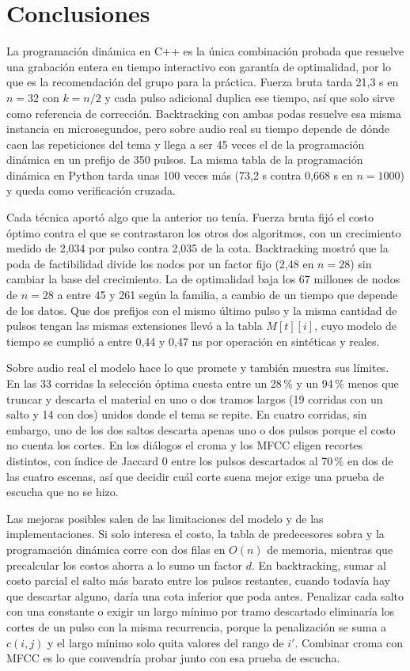 \section{Conclusiones}
\label{sec:conclusiones}

La programación dinámica en C++ es la única combinación probada que resuelve una grabación entera en tiempo interactivo con garantía de optimalidad, por lo que es la recomendación del grupo para la práctica. Fuerza bruta tarda 21,3 s en $n = 32$ con $k = n/2$ y cada pulso adicional duplica ese tiempo, así que solo sirve como referencia de corrección. Backtracking con ambas podas resuelve esa misma instancia en microsegundos, pero sobre audio real su tiempo depende de dónde caen las repeticiones del tema y llega a ser 45 veces el de la programación dinámica en un prefijo de 350 pulsos. La misma tabla de la programación dinámica en Python tarda unas 100 veces más (73,2 s contra 0,668 s en $n = 1000$) y queda como verificación cruzada.

Cada técnica aportó algo que la anterior no tenía. Fuerza bruta fijó el costo óptimo contra el que se contrastaron los otros dos algoritmos, con un crecimiento medido de 2,034 por pulso contra 2,035 de la cota. Backtracking mostró que la poda de factibilidad divide los nodos por un factor fijo (2,48 en $n = 28$) sin cambiar la base del crecimiento. La de optimalidad baja los 67 millones de nodos de $n = 28$ a entre 45 y 261 según la familia, a cambio de un tiempo que depende de los datos. Que dos prefijos con el mismo último pulso y la misma cantidad de pulsos tengan las mismas extensiones llevó a la tabla $M[t][i]$, cuyo modelo de tiempo se cumplió a entre 0,44 y 0,47 ns por operación en sintéticas y reales.

Sobre audio real el modelo hace lo que promete y también muestra sus límites. En las 33 corridas la selección óptima cuesta entre un 28\,\% y un 94\,\% menos que truncar y descarta el material en uno o dos tramos largos (19 corridas con un salto y 14 con dos) unidos donde el tema se repite. En cuatro corridas, sin embargo, uno de los dos saltos descarta apenas uno o dos pulsos porque el costo no cuenta los cortes. En los diálogos el croma y los MFCC eligen recortes distintos, con índice de Jaccard 0 entre los pulsos descartados al 70\,\% en dos de las cuatro escenas, así que decidir cuál corte suena mejor exige una prueba de escucha que no se hizo.

Las mejoras posibles salen de las limitaciones del modelo y de las implementaciones. Si solo interesa el costo, la tabla de predecesores sobra y la programación dinámica corre con dos filas en $O(n)$ de memoria, mientras que precalcular los costos ahorra a lo sumo un factor $d$. En backtracking, sumar al costo parcial el salto más barato entre los pulsos restantes, cuando todavía hay que descartar alguno, daría una cota inferior que poda antes. Penalizar cada salto con una constante o exigir un largo mínimo por tramo descartado eliminaría los cortes de un pulso con la misma recurrencia, porque la penalización se suma a $c(i,j)$ y el largo mínimo solo quita valores del rango de $i'$. Combinar croma con MFCC es lo que convendría probar junto con esa prueba de escucha.
